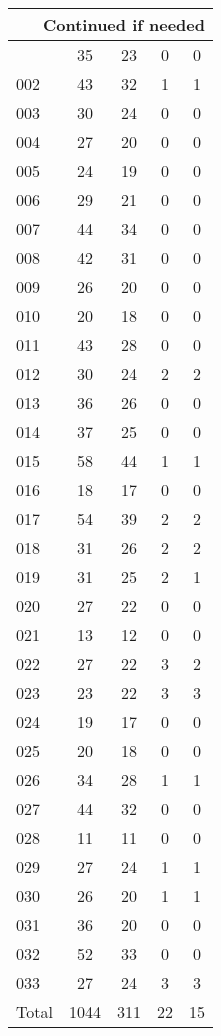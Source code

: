 \begin{center}
\begin{longtable}{l|c|c|c|c}
\hline \multicolumn{5}{|r|}{{Continued if needed}} \\ \hline
\endfoot 
001 & 35 & 23 & 0 & 0\\ \hline
002 & 43 & 32 & 1 & 1\\ \hline
003 & 30 & 24 & 0 & 0\\ \hline
004 & 27 & 20 & 0 & 0\\ \hline
005 & 24 & 19 & 0 & 0\\ \hline
006 & 29 & 21 & 0 & 0\\ \hline
007 & 44 & 34 & 0 & 0\\ \hline
008 & 42 & 31 & 0 & 0\\ \hline
009 & 26 & 20 & 0 & 0\\ \hline
010 & 20 & 18 & 0 & 0\\ \hline
011 & 43 & 28 & 0 & 0\\ \hline
012 & 30 & 24 & 2 & 2\\ \hline
013 & 36 & 26 & 0 & 0\\ \hline
014 & 37 & 25 & 0 & 0\\ \hline
015 & 58 & 44 & 1 & 1\\ \hline
016 & 18 & 17 & 0 & 0\\ \hline
017 & 54 & 39 & 2 & 2\\ \hline
018 & 31 & 26 & 2 & 2\\ \hline
019 & 31 & 25 & 2 & 1\\ \hline
020 & 27 & 22 & 0 & 0\\ \hline
021 & 13 & 12 & 0 & 0\\ \hline
022 & 27 & 22 & 3 & 2\\ \hline
023 & 23 & 22 & 3 & 3\\ \hline
024 & 19 & 17 & 0 & 0\\ \hline
025 & 20 & 18 & 0 & 0\\ \hline
026 & 34 & 28 & 1 & 1\\ \hline
027 & 44 & 32 & 0 & 0\\ \hline
028 & 11 & 11 & 0 & 0\\ \hline
029 & 27 & 24 & 1 & 1\\ \hline
030 & 26 & 20 & 1 & 1\\ \hline
031 & 36 & 20 & 0 & 0\\ \hline
032 & 52 & 33 & 0 & 0\\ \hline
033 & 27 & 24 & 3 & 3\\ \hline
\hline \hline
Total & 1044 & 311 & 22 & 15



\end{longtable}
\end{center}
 
